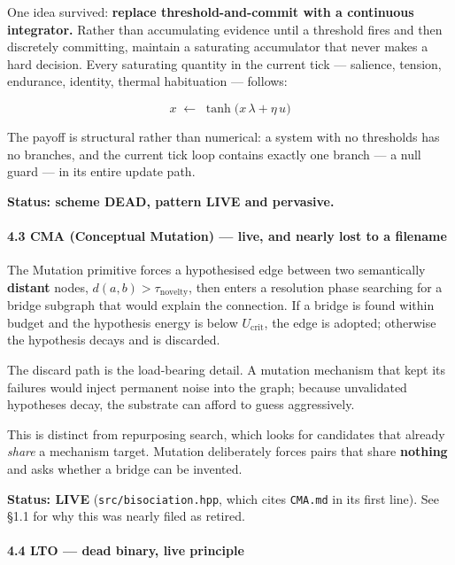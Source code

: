 \documentclass[
  11pt,
  a4paper,
]{article}
\begin{document}
One idea survived: \textbf{replace threshold-and-commit with a
continuous integrator.} Rather than accumulating evidence until a
threshold fires and then discretely committing, maintain a saturating
accumulator that never makes a hard decision. Every saturating quantity
in the current tick --- salience, tension, endurance, identity, thermal
habituation --- follows:

\[
x \;\leftarrow\; \tanh\!\big(x\,\lambda + \eta\,u\big)
\]

The payoff is structural rather than numerical: a system with no
thresholds has no branches, and the current tick loop contains exactly
one branch --- a null guard --- in its entire update path.

\textbf{Status: scheme DEAD, pattern LIVE and pervasive.}

\paragraph{4.3 CMA (Conceptual Mutation) --- live, and nearly lost to a
filename}\label{cma-conceptual-mutation-live-and-nearly-lost-to-a-filename}

The Mutation primitive forces a hypothesised edge between two
semantically \textbf{distant} nodes, \(d(a,b) > \tau_{\text{novelty}}\),
then enters a resolution phase searching for a bridge subgraph that
would explain the connection. If a bridge is found within budget and the
hypothesis energy is below \(U_{\text{crit}}\), the edge is adopted;
otherwise the hypothesis decays and is discarded.

The discard path is the load-bearing detail. A mutation mechanism that
kept its failures would inject permanent noise into the graph; because
unvalidated hypotheses decay, the substrate can afford to guess
aggressively.

This is distinct from repurposing search, which looks for candidates
that already \emph{share} a mechanism target. Mutation deliberately
forces pairs that share \textbf{nothing} and asks whether a bridge can
be invented.

\textbf{Status: LIVE} (\texttt{src/bisociation.hpp}, which cites
\texttt{CMA.md} in its first line). See §1.1 for why this was nearly
filed as retired.

\paragraph{4.4 LTO --- dead binary, live
principle}\label{lto-dead-binary-live-principle}
\end{document}

